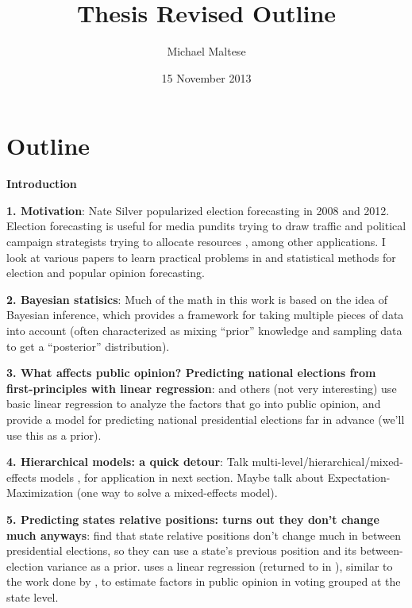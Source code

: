 \documentclass[12pt]{article}
\begin{document}
\title{\textbf{Thesis Revised Outline}}
\author{Michael Maltese}
\date{15 November 2013}
\maketitle

\section*{Outline}

\textbf{Introduction}

\textbf{1. Motivation}: Nate Silver \citeyearpar{Silver:2012aa} popularized election forecasting in 2008 and 2012. Election forecasting is useful for media pundits trying to draw traffic and political campaign strategists trying to allocate resources \citep{Strauss:2007aa}, among other applications. I look at various papers to learn practical problems in and statistical methods for election and popular opinion forecasting.

\textbf{2. Bayesian statisics}: Much of the math in this work is based on the idea of Bayesian inference, which provides a framework for taking multiple pieces of data into account (often characterized as mixing ``prior'' knowledge and sampling data to get a ``posterior'' distribution).

\textbf{3. What affects public opinion? Predicting national elections from first-principles with linear regression}: \cite{Hibbs:2008aa} and others (not very interesting) use basic linear regression to analyze the factors that go into public opinion, and provide a model for predicting national presidential elections far in advance (we'll use this as a prior).

\textbf{4. Hierarchical models: a quick detour}: Talk multi-level/hierarchical/mixed-effects models \citep{Gelman:2006aa,Gelman:2007aa}, for application in next section. Maybe talk about Expectation-Maximization (one way to solve a mixed-effects model).

\textbf{5. Predicting states relative positions: turns out they don't change much anyways}: \cite{Lock:2010aa} find that state relative positions don't change much in between presidential elections, so they can use a state's previous position and its between-election variance as a prior. \cite{Campbell:1992aa} uses a linear regression (returned to in \citealp{Campbell:2006aa}), similar to the work done by \cite{Hibbs:2008aa}, to estimate factors in public opinion in  voting grouped at the state level.
\end{document}
